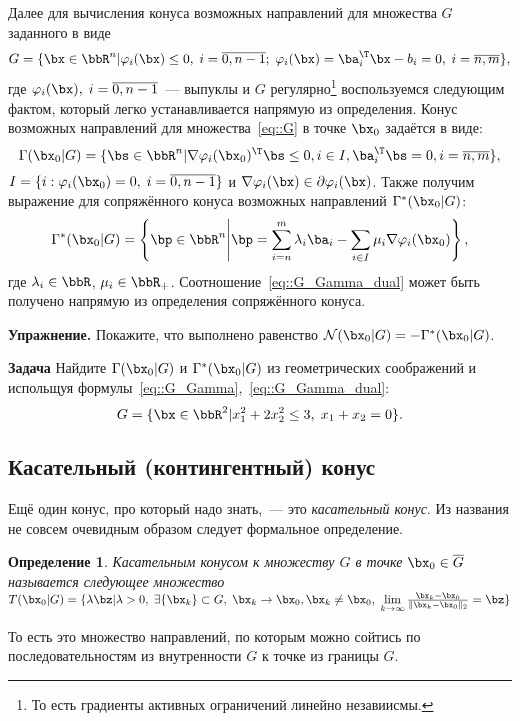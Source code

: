 \documentclass[12pt]{article}
\newtheorem{Def}{ Определение}
\begin{document}
Далее для вычисления конуса возможных направлений для множества $G$ заданного в виде
\begin{equation}
G = \{ \bx \in \bbR^n | \varphi_i(\bx) \leq 0, \; i = \overline{0,n-1}; \; \varphi_i(\bx) = \ba_i^{\T}\bx - b_i = 0, \; i = \overline{n, m} \},
\label{eq::G}
\end{equation}
где $\varphi_i(\bx), \; i = \overline{0,n-1}$~--- выпуклы и $G$ регулярно\footnote{То есть градиенты активных ограничений линейно незавиисмы.} воспользуемся следующим фактом, который легко устанавливается напрямую из определения.
Конус возможных направлений для множества~\eqref{eq::G} в точке $\bx_0$ задаётся в виде:
\begin{equation}
\Gamma(\bx_0|G) = \{ \bs \in \bbR^n | \nabla \varphi_i(\bx_0)^{\T} \bs \leq 0, i \in I, \ba^{\T}_i \bs = 0, i = \overline{n,m} \},
\label{eq::G_Gamma}
\end{equation}
$I = \{i: \varphi_i(\bx_0) = 0, \; i = \overline{0,n-1}\}$ и $\nabla \varphi_i(\bx) \in \partial \varphi_i(\bx)$.
Также получим выражение для сопряжённого конуса возможных направлений $\Gamma^*(\bx_0|G)$:
\begin{equation}
\Gamma^*(\bx_0|G) = \left \{ \bp \in \bbR^n \middle\rvert \bp = \sum\limits_{i = n}^m \lambda_i\ba_i - \sum\limits_{i \in I} \mu_i \nabla\varphi_i(\bx_0) \right \},
\label{eq::G_Gamma_dual}
\end{equation} 
где $\lambda_i \in \bbR$, $\mu_i \in \bbR_+$.
Соотношение~\eqref{eq::G_Gamma_dual} может быть получено напрямую из определения сопряжённого конуса.

\textbf{Упражнение.} Покажите, что выполнено равенство $\mathcal{N}(\bx_0|G) = -\Gamma^*(\bx_0|G)$.

\textbf{Задача} Найдите $\Gamma(\bx_0|G)$ и $\Gamma^*(\bx_0|G)$ из геометрических соображений и испольщуя формулы~\eqref{eq::G_Gamma},~\eqref{eq::G_Gamma_dual}:
\[
G = \{ \bx \in \bbR^2 | x_1^2 + 2x_2^2 \leq 3, \; x_1 + x_2 = 0 \}.
\]

\subsection{Касательный (контингентный) конус}
Ещё один конус, про который надо знать,~--- это \emph{касательный конус}.
Из названия не совсем очевидным образом следует формальное определение.
\begin{Def}
Касательным конусом к множеству $G$ в точке $\bx_0 \in \overline{G}$ называется следующее множество $T(\bx_0 |G) = \{ \lambda \bz | \lambda > 0, \; \exists \{\bx_k\} \subset G, \; \bx_k \rightarrow \bx_0, \bx_k \neq \bx_0, \; \lim\limits_{k \rightarrow \infty} \frac{\bx_k - \bx_0}{\|\bx_k - \bx_0\|_2} = \bz \}$
\end{Def}
То есть это множество направлений, по которым можно сойтись по последовательностям из внутренности $G$ к точке из границы $G$.
\end{document}
